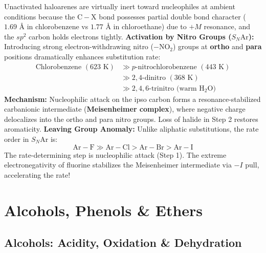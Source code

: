 \documentclass[10pt,twoside,openright]{book}
\begin{document}
\begin{conceptbox}
Unactivated haloarenes are virtually inert toward nucleophiles at ambient conditions because the $\mathrm{C-X}$ bond possesses partial double bond character ($1.69\text{ \AA}$ in chlorobenzene vs $1.77\text{ \AA}$ in chloroethane) due to $+M$ resonance, and the $sp^2$ carbon holds electrons tightly.
\textbf{Activation by Nitro Groups ($S_N\mathrm{Ar}$):}
Introducing strong electron-withdrawing nitro ($-\mathrm{NO_2}$) groups at \textbf{ortho} and \textbf{para} positions dramatically enhances substitution rate:
\begin{align}
  \text{Chlorobenzene } (623\text{ K}) &\gg p\text{-nitrochlorobenzene } (443\text{ K}) \\
  &\gg 2,4\text{-dinitro } (368\text{ K}) \\
  &\gg 2,4,6\text{-trinitro (warm } \mathrm{H_2O})
\end{align}
\textbf{Mechanism:} Nucleophilic attack on the ipso carbon forms a resonance-stabilized carbanionic intermediate (\textbf{Meisenheimer complex}), where negative charge delocalizes into the ortho and para nitro groups. Loss of halide in Step 2 restores aromaticity.
\textbf{Leaving Group Anomaly:} Unlike aliphatic substitutions, the rate order in $S_N\mathrm{Ar}$ is:
\begin{equation}
  \mathrm{Ar-F} \gg \mathrm{Ar-Cl} > \mathrm{Ar-Br} > \mathrm{Ar-I}
\end{equation}
The rate-determining step is nucleophilic attack (Step 1). The extreme electronegativity of fluorine stabilizes the Meisenheimer intermediate via $-I$ pull, accelerating the rate!
\end{conceptbox}

\section{Alcohols, Phenols \& Ethers}

\subsection{Alcohols: Acidity, Oxidation \& Dehydration}
\end{document}
